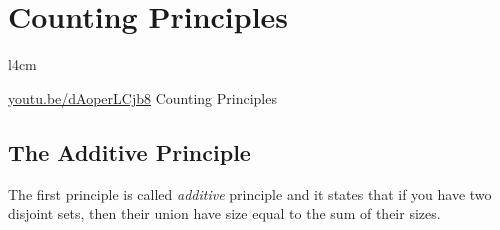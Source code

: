 \chapter{Counting Principles}
\begin{wrapfigure}{l}{4cm}
  \begin{center}
    \vskip -0.5cm
    \vskip 0.25cm
    \href{https://youtu.be/dAoperLCjb8}{youtu.be/dAoperLCjb8}
    {\footnotesize Counting Principles}
  \end{center}
  \vskip -1cm
\end{wrapfigure}

\section{The Additive Principle}
The first principle is called \textit{additive} principle and it states that if
you have two disjoint sets, then their union have size equal to the sum of their
sizes.

